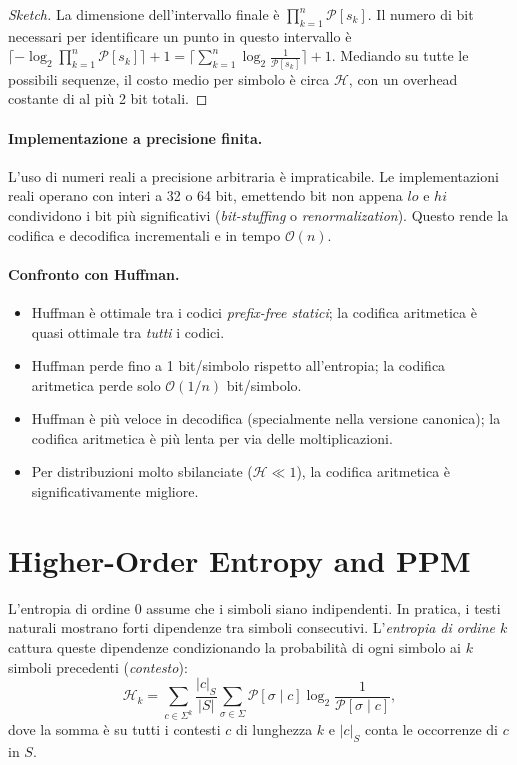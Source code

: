 \documentclass[12pt, a4paper, oneside]{book}
\theoremstyle{plain}
\theoremstyle{definition}
\theoremstyle{remark}
\newcommand{\OO}[1]{\mathcal{O}\!\left(#1\right)}
\begin{document}
\begin{proof}[Sketch]
La dimensione dell'intervallo finale è $\prod_{k=1}^{n} \mathcal{P}[s_k]$. Il numero di bit necessari per identificare un punto in questo intervallo è $\lceil -\log_2 \prod_{k=1}^{n} \mathcal{P}[s_k] \rceil + 1 = \lceil \sum_{k=1}^n \log_2 \frac{1}{\mathcal{P}[s_k]} \rceil + 1$. Mediando su tutte le possibili sequenze, il costo medio per simbolo è circa $\mathcal{H}$, con un overhead costante di al più 2 bit totali.
\end{proof}

\paragraph{Implementazione a precisione finita.}
L'uso di numeri reali a precisione arbitraria è impraticabile. Le implementazioni reali operano con interi a 32 o 64 bit, emettendo bit non appena $lo$ e $hi$ condividono i bit più significativi (\emph{bit-stuffing} o \emph{renormalization}). Questo rende la codifica e decodifica incrementali e in tempo $\OO{n}$.

\paragraph{Confronto con Huffman.}
\begin{itemize}
  \item Huffman è ottimale tra i codici \emph{prefix-free statici}; la codifica aritmetica è quasi ottimale tra \emph{tutti} i codici.
  \item Huffman perde fino a 1 bit/simbolo rispetto all'entropia; la codifica aritmetica perde solo $\OO{1/n}$ bit/simbolo.
  \item Huffman è più veloce in decodifica (specialmente nella versione canonica); la codifica aritmetica è più lenta per via delle moltiplicazioni.
  \item Per distribuzioni molto sbilanciate ($\mathcal{H} \ll 1$), la codifica aritmetica è significativamente migliore.
\end{itemize}

\section{Higher-Order Entropy and PPM}
\label{sec:ppm}

L'entropia di ordine 0 assume che i simboli siano indipendenti. In pratica, i testi naturali mostrano forti dipendenze tra simboli consecutivi. L'\emph{entropia di ordine $k$} cattura queste dipendenze condizionando la probabilità di ogni simbolo ai $k$ simboli precedenti (\emph{contesto}):
\[
\mathcal{H}_k = \sum_{c \in \Sigma^k} \frac{|c|_S}{|S|} \sum_{\sigma \in \Sigma} \mathcal{P}[\sigma \mid c] \log_2 \frac{1}{\mathcal{P}[\sigma \mid c]},
\]
dove la somma è su tutti i contesti $c$ di lunghezza $k$ e $|c|_S$ conta le occorrenze di $c$ in $S$.
\end{document}
